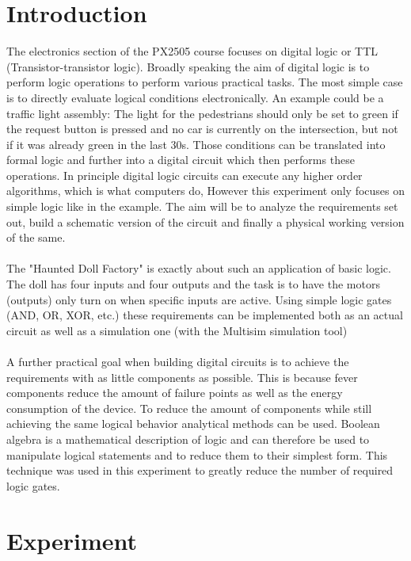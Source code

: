 \documentclass[14pt]{article}
\begin{document}
\section{Introduction}

The electronics section of the PX2505 course focuses on digital logic or TTL (Transistor-transistor logic). Broadly speaking the aim of digital logic is to perform logic
operations to perform various practical tasks. The most simple case is to directly evaluate logical conditions electronically. An example could
be a traffic light assembly: The light for the pedestrians should only be set to green if the request button is pressed and no car is currently
on the intersection, but not if it was already green in the last 30s. Those conditions can be translated into formal logic and further into
a digital circuit which then performs these operations. In principle digital logic circuits can execute any higher order algorithms, which is what computers do,
However this experiment only focuses on simple logic like in the example. The aim will be to analyze the requirements set out, build a schematic
version of the circuit and finally a physical working version of the same.\\
\\
The "Haunted Doll Factory" is exactly about such an application of basic logic. The doll has four inputs and four outputs and the task is to 
have the motors (outputs) only turn on when specific inputs are active. Using simple logic gates (AND, OR, XOR, etc.) these requirements can be implemented
both as an actual circuit as well as a simulation one (with the Multisim simulation tool)\\
\\
A further practical goal when building digital circuits is to achieve the requirements with as little components as possible. This is because fever components
reduce the amount of failure points as well as the energy consumption of the device. To reduce the amount of components while still achieving the
same logical behavior analytical methods can be used. Boolean algebra is a mathematical description of logic and can therefore be used
to manipulate logical statements and to reduce them to their simplest form. This technique was used in this experiment to greatly reduce the 
number of required logic gates.

\section{Experiment}
\end{document}
